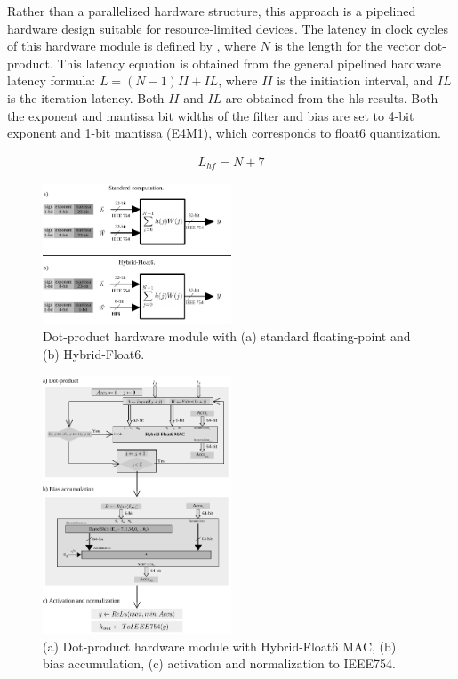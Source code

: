 Rather than a parallelized hardware structure, this approach is a pipelined hardware design suitable for resource-limited devices. The latency in clock cycles of this hardware module is defined by , where $N$ is the length for the vector dot-product. This latency equation is obtained from the general pipelined hardware latency formula: $L=\left(N-1\right)II+IL$, where $II$ is the initiation interval, and $IL$ is the iteration latency. Both $II$ and $IL$ are obtained from the \gls{hls} results. Both the exponent and mantissa bit widths of the filter and bias are set to 4-bit exponent and 1-bit mantissa (E4M1), which corresponds to float6 quantization.

\begin{eqnarray} \label{eq:dot_custom_float_latency}
L_{hf}=N+7
\end{eqnarray}

\begin{figure}[h!]
	\centering
	\includegraphics[width=0.5\textwidth]{./chapters/cnn_accelerator/figures/dot-product_unit.pdf}
	\caption{Dot-product hardware module with (a) standard floating-point and (b) Hybrid-Float6.}
	\label{fig:dot_product}
\end{figure}

\begin{figure}[h!]
	\centering
	\includegraphics[width=0.5\textwidth]{./chapters/cnn_accelerator/figures/dot_product_hybrid.pdf}
	\caption{(a) Dot-product hardware module with Hybrid-Float6 MAC, (b) bias accumulation, (c) activation and normalization to IEEE754.}
	\label{fig:dot_product_loop}
\end{figure}

